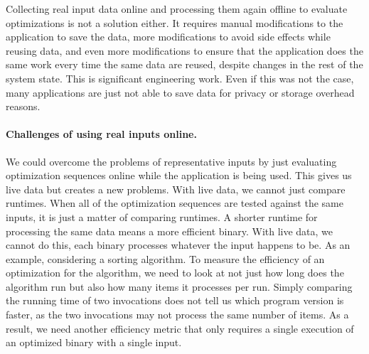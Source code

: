     Collecting real input data online and processing them again offline to evaluate optimizations is not a solution either. It requires
    manual modifications to the application to save the data, more modifications to avoid side effects while reusing data, and even more
    modifications to ensure that the application does the same work every time the same data are reused, despite changes in the rest of
    the system state. 
    This is significant engineering work. Even if this was not the case, many applications are just not able to save
    data for privacy or storage overhead reasons.


    \paragraph{Challenges of using real inputs online.} We could overcome the problems of representative inputs by just evaluating
    optimization sequences online while the application is being used.
    This gives us live data but creates a new problems.
    With live data, we cannot just compare runtimes.
    When all of the optimization sequences are tested against the same inputs, it is just a matter of comparing runtimes.
    A shorter runtime for processing the same data means a more efficient binary.
    With live data, we cannot do this, each binary processes
    whatever the input happens to be.
    As an example, considering a sorting algorithm. To measure the efficiency of an optimization for the algorithm, we need to look at not just
    how long does the algorithm run but also how many items it processes per run. Simply comparing the running time of two invocations does not
    tell us which program version is faster, as the two invocations may not process the same number of items. As a result, we need another efficiency metric
    that only requires a single execution of an optimized binary with a single input.

